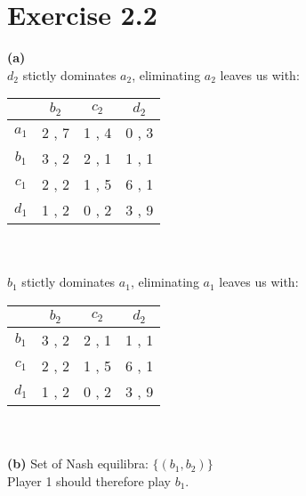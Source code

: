 \documentclass[11pt,a4paper]{article}
\begin{document}
\section*{Exercise 2.2}
\textbf{(a)}\\
$d_2$ stictly dominates $a_2$, eliminating $a_2$ leaves us with:\\
\begin{tabular}{c|c|c|c|}
  & $b_2$ & $c_2$ & $d_2$ \\
\hline
$a_1$ & 2 , 7 & 1 , 4 & 0 , 3 \\
\hline
$b_1$ & 3 , 2 & 2 , 1 & 1 , 1 \\
\hline
$c_1$ & 2 , 2 & 1 , 5 & 6 , 1 \\
\hline
$d_1$ & 1 , 2 & 0 , 2 & 3 , 9 \\
\hline
\end{tabular}\\
\\
$b_1$ stictly dominates $a_1$, eliminating $a_1$ leaves us with:\\
\begin{tabular}{c|c|c|c|}
  & $b_2$ & $c_2$ & $d_2$ \\
\hline
$b_1$ & 3 , 2 & 2 , 1 & 1 , 1 \\
\hline
$c_1$ & 2 , 2 & 1 , 5 & 6 , 1 \\
\hline
$d_1$ & 1 , 2 & 0 , 2 & 3 , 9 \\
\hline
\end{tabular}\\
\\
\textbf{(b)} Set of Nash equilibra: $\{(b_1,b_2)\}$\\
Player 1 should therefore play $b_1$.

\label{lastpage}
\end{document}
